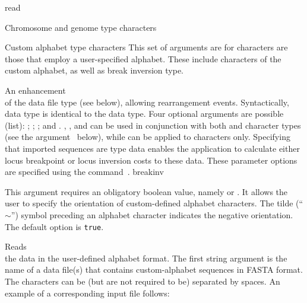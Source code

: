 \begin{command}{read}{}
\begin{arguments}
\begin{argumentgroup}{Chromosome and genome type characters}
   \end{argumentgroup}
   
   
   \begin{argumentgroup}{Custom alphabet type characters}
	This set of arguments are for characters are those that employ a user-specified alphabet. These include
	characters of the custom alphabet, as well as break inversion type.
	
	{An enhancement \\ of the data file type  (see below), allowing
            rearrangement events. Syntactically,  data type is identical to the
             data type.  Four optional arguments are possible (\poylident list): 
            ;  ;  ;  and  .
            , , and  can be used in conjunction
            with both  and  character types 
            (see the argument~ below), 
            while  can be applied to  characters only.
            Specifying that imported sequences are  type data enables
            the application to calculate  either locus breakpoint or locus inversion costs to these data.  These parameter
            options are specified using the command~.} 
            {breakinv}
           
         \begin{description}
	{This argument requires an obligatory boolean value, namely  or 
	. It allows the user to specify the orientation of custom-defined alphabet
	characters. The tilde (``$\sim$'') symbol preceding an alphabet character indicates the negative 
	orientation. The default option is \texttt{true}. }
	{}
	\end{description}
      
            {Reads \\ the data in the user-defined alphabet format. The first string argument is
            the name of a data file(s) that contains custom-alphabet sequences in FASTA format. 
            The characters can be (but are not required to be) separated by spaces.
            An example of a corresponding input file follows:\\
               
}
\end{argumentgroup}
\end{arguments}
\end{command}
